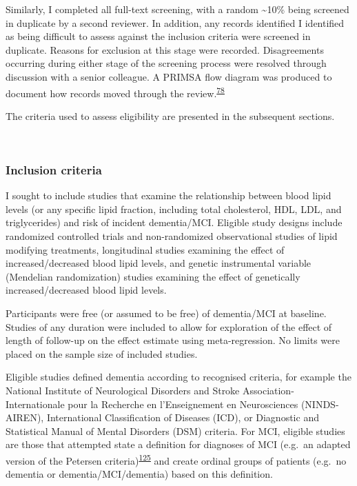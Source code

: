 \documentclass[a4paper, twoside]{templates/ociamthesis}
\begin{document}
Similarly, I completed all full-text screening, with a random \textasciitilde10\% being screened in duplicate by a second reviewer. In addition, any records identified I identified as being difficult to assess against the inclusion criteria were screened in duplicate. Reasons for exclusion at this stage were recorded. Disagreements occurring during either stage of the screening process were resolved through discussion with a senior colleague. A PRIMSA flow diagram was produced to document how records moved through the review.\textsuperscript{\protect\hyperlink{ref-page2021}{78}}

The criteria used to assess eligibility are presented in the subsequent sections.

~

\hypertarget{inclusion-criteria}{%
\subsubsection{Inclusion criteria}\label{inclusion-criteria}}

I sought to include studies that examine the relationship between blood lipid levels (or any specific lipid fraction, including total cholesterol, HDL, LDL, and triglycerides) and risk of incident dementia/MCI. Eligible study designs include randomized controlled trials and non-randomized observational studies of lipid modifying treatments, longitudinal studies examining the effect of increased/decreased blood lipid levels, and genetic instrumental variable (Mendelian randomization) studies examining the effect of genetically increased/decreased blood lipid levels.

Participants were free (or assumed to be free) of dementia/MCI at baseline. Studies of any duration were included to allow for exploration of the effect of length of follow-up on the effect estimate using meta-regression. No limits were placed on the sample size of included studies.

Eligible studies defined dementia according to recognised criteria, for example the National Institute of Neurological Disorders and Stroke Association-Internationale pour la Recherche en l'Enseignement en Neurosciences (NINDS-AIREN), International Classification of Diseases (ICD), or Diagnostic and Statistical Manual of Mental Disorders (DSM) criteria. For MCI, eligible studies are those that attempted state a definition for diagnoses of MCI (e.g.~an adapted version of the Petersen criteria)\textsuperscript{\protect\hyperlink{ref-petersen1999}{125}} and create ordinal groups of patients (e.g.~no dementia or dementia/MCI/dementia) based on this definition.
\end{document}
